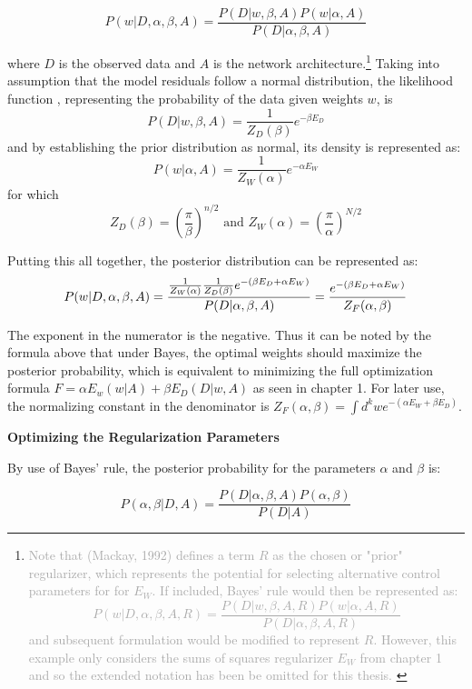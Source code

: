 $$
P(w|D,\alpha,\beta,A) = \frac{P(D|w,\beta,A) P(w|\alpha,A)}{P(D|\alpha,\beta,A)}
$$

where $D$ is the observed data and $A$ is the network architecture.\footnote{
\textcolor{darkgray}{
Note that (Mackay, 1992) defines a term $R$ as the chosen or "prior" regularizer, which represents the potential for selecting alternative control parameters for for $E_W$.  If included, Bayes' rule would then be represented  as:
$$
P(w|D,\alpha,\beta,A,R) = \frac{P(D|w,\beta,A,R) P(w|\alpha,A,R)}{P(D|\alpha,\beta,A,R)}
$$
 and subsequent formulation would be modified to represent $R$. However, this example only considers the sums of squares regularizer $E_W$ from chapter 1 and so the extended notation has been be omitted for this thesis.
 }}
Taking into assumption that the model residuals follow a normal distribution, the likelihood function \cite{foresee1997gauss}, representing the probability of the data given weights $w$, is
$$
P(D|w,\beta,A) = \frac{1}{Z_D(\beta)} e^{-\beta E_D}
$$
and by establishing the prior distribution as normal, its density is represented as:
$$
P(w|\alpha,A) = \frac{1}{Z_W(\alpha)} e^{-\alpha E_W}
$$
for which
$$
Z_D(\beta) = \left( \frac{\pi}{\beta} \right) ^{n/2} \text{ and }
Z_W(\alpha) = \left( \frac{\pi}{\alpha} \right) ^{N/2}
$$

Putting this all together, the posterior distribution can be represented as:
$$
P(w|D,\alpha,\beta,A) = \frac{\frac{1}{Z_W(\alpha)} \frac{1}{Z_D(\beta)} e^{-(\beta E_D + \alpha E_W)}}{P(D|\alpha,\beta,A)} \\
= \frac{e^{-(\beta E_D + \alpha E_W)}}{Z_F(\alpha,\beta)}
$$

The exponent in the numerator is the negative.  Thus it can be noted by the formula above that under Bayes, the optimal weights should maximize the posterior probability, which is equivalent to minimizing the full optimization formula $F = \alpha E_w(w|A) + \beta E_D(D|w,A)$ as seen in chapter 1.  For later use, the normalizing constant in the denominator is $Z_F(\alpha,\beta) = \int d^k w e^{-(\alpha E_W + \beta E_D)}$.


\textbf{Optimizing the Regularization Parameters}

By use of Bayes' rule, the posterior probability for the parameters $\alpha$ and $\beta$ is:

$$
P(\alpha, \beta | D,A) = \frac{P(D|\alpha,\beta,A) P(\alpha,\beta)}{P(D|A)}
$$




